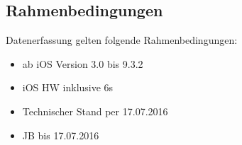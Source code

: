 \subsection{Rahmenbedingungen}
\label{sec:Rahmenbedingungen}
Datenerfassung gelten folgende Rahmenbedingungen:
\begin{itemize}
    \item ab iOS Version 3.0 bis 9.3.2
    \item iOS HW inklusive 6s
    \item Technischer Stand per 17.07.2016
    \item JB bis 17.07.2016
\end{itemize}






    